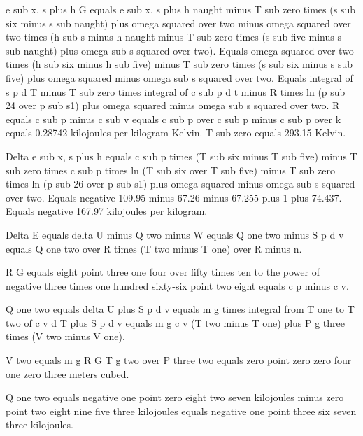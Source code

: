 e sub x, s plus h G equals e sub x, s plus h naught minus T sub zero times (s sub six minus s sub naught) plus omega squared over two minus omega squared over two times (h sub s minus h naught minus T sub zero times (s sub five minus s sub naught) plus omega sub s squared over two).  
Equals omega squared over two times (h sub six minus h sub five) minus T sub zero times (s sub six minus s sub five) plus omega squared minus omega sub s squared over two.  
Equals integral of s p d T minus T sub zero times integral of c sub p d t minus R times ln (p sub 24 over p sub s1) plus omega squared minus omega sub s squared over two.  
R equals c sub p minus c sub v equals c sub p over c sub p minus c sub p over k equals 0.28742 kilojoules per kilogram Kelvin.  
T sub zero equals 293.15 Kelvin.  

Delta e sub x, s plus h equals c sub p times (T sub six minus T sub five) minus T sub zero times c sub p times ln (T sub six over T sub five) minus T sub zero times ln (p sub 26 over p sub s1) plus omega squared minus omega sub s squared over two.  
Equals negative 109.95 minus 67.26 minus 67.255 plus 1 plus 74.437.  
Equals negative 167.97 kilojoules per kilogram.

Delta E equals delta U minus Q two minus W equals Q one two minus S p d v equals Q one two over R times (T two minus T one) over R minus n.

R G equals eight point three one four over fifty times ten to the power of negative three times one hundred sixty-six point two eight equals c p minus c v.

Q one two equals delta U plus S p d v equals m g times integral from T one to T two of c v d T plus S p d v equals m g c v (T two minus T one) plus P g three times (V two minus V one).

V two equals m g R G T g two over P three two equals zero point zero zero four one zero three meters cubed.

Q one two equals negative one point zero eight two seven kilojoules minus zero point two eight nine five three kilojoules equals negative one point three six seven three kilojoules.